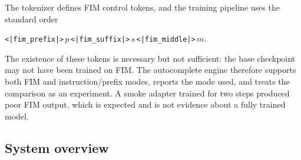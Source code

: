 The tokenizer defines FIM control tokens, and the training pipeline uses the
standard order
\begin{center}
\texttt{<|fim\_prefix|>}\,$p$\,\texttt{<|fim\_suffix|>}\,$s$\,\texttt{<|fim\_middle|>}\,$m$.
\end{center}
The existence of these tokens is necessary but not sufficient: the base
checkpoint may not have been trained on FIM. The autocomplete engine therefore
supports both FIM and instruction/prefix modes, reports the mode used, and treats
the comparison as an experiment. A smoke adapter trained for two steps produced
poor FIM output, which is expected and is not evidence about a fully trained
model.

\subsection{System overview}

